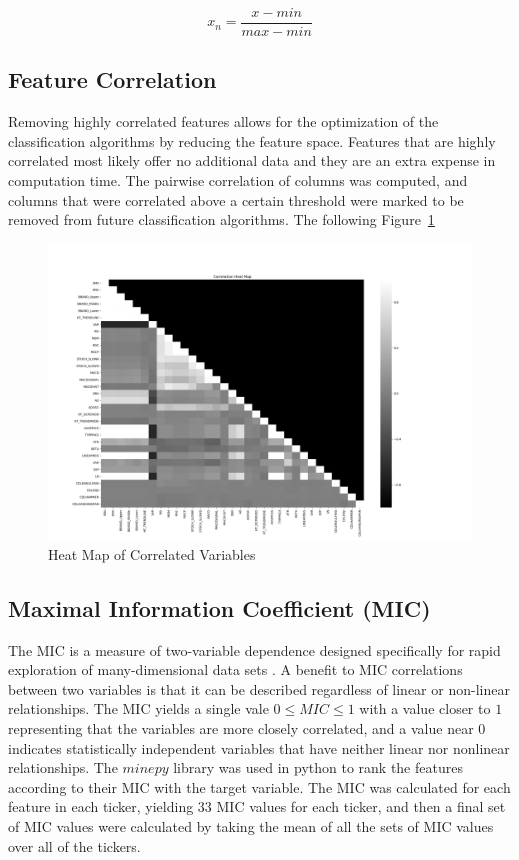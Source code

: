 \documentclass{article}
\begin{document}
\begin{equation}\label{eq:norm}
	x_n = \frac{x - min}{max - min}
\end{equation}

\subsection{Feature Correlation}
Removing highly correlated features allows for the optimization of the classification algorithms by reducing the feature space. Features that are highly correlated most likely offer no additional data and they are an extra expense in computation time. The pairwise correlation of columns was computed, and columns that were correlated above a certain threshold were marked to be removed from future classification algorithms. The following Figure~\ref{fig:corr_heatmap}

\begin{figure}[h!]
	\centering
	\includegraphics[width=\linewidth]{data/heatmapT1.png}
	\caption{Heat Map of Correlated Variables}
	\label{fig:corr_heatmap}
\end{figure}

\subsection{Maximal Information Coefficient (MIC)}
The MIC is a measure of two-variable dependence designed specifically for rapid exploration of many-dimensional data sets \cite{reshef2011detecting}. A benefit to MIC correlations between two variables is that it can be described regardless of linear or non-linear relationships. The MIC yields a single vale $0 \leq MIC \leq 1$ with a value closer to $1$ representing that the variables are more closely correlated, and a value near $0$ indicates statistically independent variables that have neither linear nor nonlinear relationships. The $minepy$ library was used in python to rank the features according to their MIC with the target variable. The MIC was calculated for each feature in each ticker, yielding 33 MIC values for each ticker, and then a final set of MIC values were calculated by taking the mean of all the sets of MIC values over all of the tickers.
\end{document}
